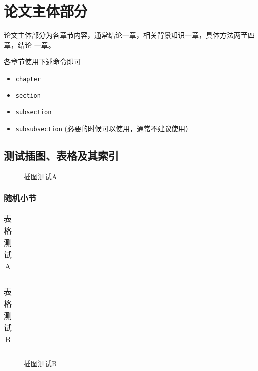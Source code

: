 
\chapter{论文主体部分}
\label{cha:mainmatter}

论文主体部分为各章节内容，通常结论一章，相关背景知识一章，具体方法两至四章，结论
一章。

各章节使用下述命令即可
\begin{itemize}
\item \texttt{chapter}
\item \texttt{section}
\item \texttt{subsection}
\item \texttt{subsubsection} (必要的时候可以使用，通常不建议使用）
\end{itemize}


\section{测试插图、表格及其索引}
\label{sec:testing}

\begin{figure}
  \centering
  
  \caption{插图测试A}
  \label{fig:test:a}
\end{figure}

\subsection{随机小节}
\label{sec:random-tf}

\begin{table}
  \centering
  \begin{tabular}{ccccc}
    \hline
  \end{tabular}
  \caption{表格测试A}
  \label{tab:test}
\end{table}


\begin{table}
  \centering
  \begin{tabular}{ccccc}
    \hline
  \end{tabular}
  \caption{表格测试B}
  \label{tab:test:b}
\end{table}


\begin{figure}
  \centering
  
  \caption{插图测试B}
  \label{fig:test:b}
\end{figure}


